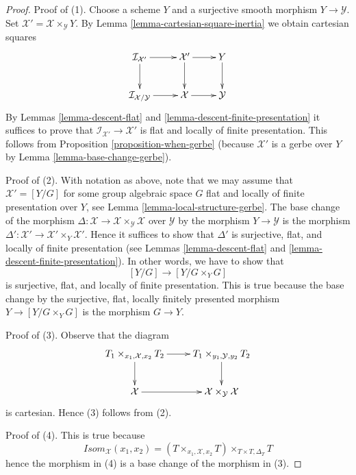 \documentclass[10pt,a4paper]{amsart}
\theoremstyle{plain}
\theoremstyle{definition}
\theoremstyle{remark}
\numberwithin{equation}{subsection}
\begin{document}
\begin{proof}
Proof of (1).
Choose a scheme $Y$ and a surjective smooth morphism $Y \to \mathcal{Y}$.
Set $\mathcal{X}' = \mathcal{X} \times_\mathcal{Y} Y$.
By Lemma \ref{lemma-cartesian-square-inertia} we obtain cartesian
squares
$$
\xymatrix{
\mathcal{I}_{\mathcal{X}'} \ar[r] \ar[d] &
\mathcal{X}' \ar[r] \ar[d] & Y \ar[d] \\
\mathcal{I}_{\mathcal{X}/\mathcal{Y}} \ar[r] &
\mathcal{X} \ar[r] & \mathcal{Y}
}
$$
By Lemmas \ref{lemma-descent-flat} and
\ref{lemma-descent-finite-presentation}
it suffices to prove that $\mathcal{I}_{\mathcal{X}'} \to \mathcal{X}'$
is flat and locally of finite presentation.
This follows from Proposition \ref{proposition-when-gerbe}
(because $\mathcal{X}'$ is a gerbe over $Y$ by
Lemma \ref{lemma-base-change-gerbe}).

\medskip\noindent
Proof of (2). With notation as above, note that we may assume that
$\mathcal{X}' = [Y/G]$ for some group algebraic space $G$ flat and
locally of finite presentation over $Y$, see
Lemma \ref{lemma-local-structure-gerbe}.
The base change of the morphism
$\Delta : \mathcal{X} \to \mathcal{X} \times_\mathcal{Y} \mathcal{X}$
over $\mathcal{Y}$ by the morphism $Y \to \mathcal{Y}$
is the morphism
$\Delta' : \mathcal{X}' \to \mathcal{X}' \times_Y \mathcal{X}'$.
Hence it suffices to show that $\Delta'$ is
surjective, flat, and locally of finite presentation
(see Lemmas \ref{lemma-descent-flat} and
\ref{lemma-descent-finite-presentation}).
In other words, we have to show that
$$
[Y/G] \longrightarrow [Y/G \times_Y G]
$$
is surjective, flat, and locally of finite presentation.
This is true because the base change by the surjective, flat,
locally finitely presented morphism $Y \to [Y/G \times_Y G]$
is the morphism $G \to Y$.

\medskip\noindent
Proof of (3). Observe that the diagram
$$
\xymatrix{
T_1 \times_{x_1, \mathcal{X}, x_2} T_2 \ar[d] \ar[r] &
T_1 \times_{y_1, \mathcal{Y}, y_2} T_2 \ar[d] \\
\mathcal{X} \ar[r] & \mathcal{X} \times_\mathcal{Y} \mathcal{X}
}
$$
is cartesian. Hence (3) follows from (2).

\medskip\noindent
Proof of (4). This is true because
$$
\mathit{Isom}_\mathcal{X}(x_1, x_2) =
(T \times_{x_1, \mathcal{X}, x_2} T) \times_{T \times T, \Delta_T} T
$$
hence the morphism in (4) is a base change of the morphism in (3).
\end{proof}
\end{document}
